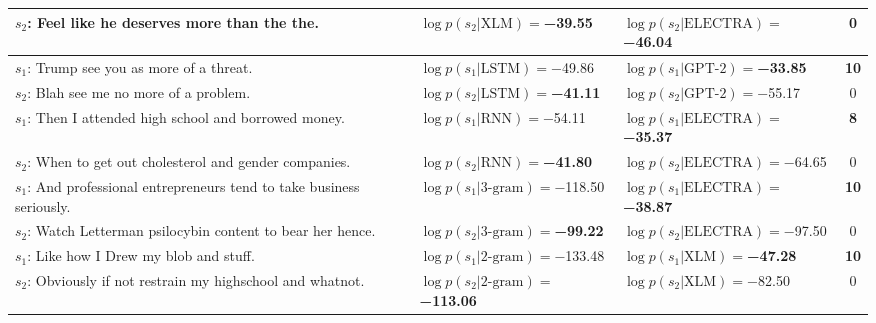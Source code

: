 \begin{tabularx}{\textwidth}{lllc}
                        $s_2$: Feel like he deserves more than the the. &      $\log p(s_2 | \textrm{XLM})=$\textbf{\num{-39.55}} &           $\log p(s_2 | \textrm{ELECTRA})=$\num{-46.04} &            \num{0} \\\midrule
                              $s_1$: Trump see you as more of a threat. &              $\log p(s_1 | \textrm{LSTM})=$\num{-49.86} &    $\log p(s_1 | \textrm{GPT-2})=$\textbf{\num{-33.85}} &  \textbf{\num{10}} \\
                               $s_2$: Blah see me no more of a problem. &     $\log p(s_2 | \textrm{LSTM})=$\textbf{\num{-41.11}} &             $\log p(s_2 | \textrm{GPT-2})=$\num{-55.17} &            \num{0} \\\midrule
                 $s_1$: Then I attended high school and borrowed money. &               $\log p(s_1 | \textrm{RNN})=$\num{-54.11} &  $\log p(s_1 | \textrm{ELECTRA})=$\textbf{\num{-35.37}} &   \textbf{\num{8}} \\
               $s_2$: When to get out cholesterol and gender companies. &      $\log p(s_2 | \textrm{RNN})=$\textbf{\num{-41.80}} &           $\log p(s_2 | \textrm{ELECTRA})=$\num{-64.65} &            \num{0} \\\midrule
 $s_1$: And professional entrepreneurs tend to take business seriously. &           $\log p(s_1 | \textrm{3-gram})=$\num{-118.50} &  $\log p(s_1 | \textrm{ELECTRA})=$\textbf{\num{-38.87}} &  \textbf{\num{10}} \\
           $s_2$: Watch Letterman psilocybin content to bear her hence. &   $\log p(s_2 | \textrm{3-gram})=$\textbf{\num{-99.22}} &           $\log p(s_2 | \textrm{ELECTRA})=$\num{-97.50} &            \num{0} \\\midrule
                              $s_1$: Like how I Drew my blob and stuff. &           $\log p(s_1 | \textrm{2-gram})=$\num{-133.48} &      $\log p(s_1 | \textrm{XLM})=$\textbf{\num{-47.28}} &  \textbf{\num{10}} \\
            $s_2$: Obviously if not restrain my highschool and whatnot. &  $\log p(s_2 | \textrm{2-gram})=$\textbf{\num{-113.06}} &               $\log p(s_2 | \textrm{XLM})=$\num{-82.50} &            \num{0} \\
\bottomrule
\end{tabularx}
